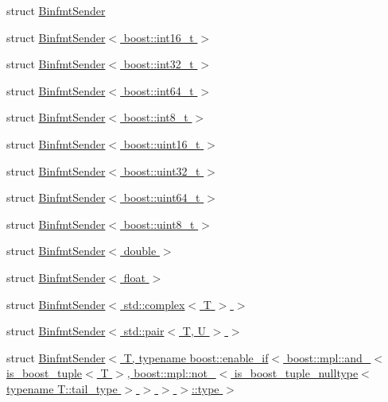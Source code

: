 \begin{DoxyCompactItemize}
\item 
struct \hyperlink{structgnuplotio_1_1_binfmt_sender}{Binfmt\+Sender}
\item 
struct \hyperlink{structgnuplotio_1_1_binfmt_sender_3_01boost_1_1int16__t_01_4}{Binfmt\+Sender$<$ boost\+::int16\+\_\+t $>$}
\item 
struct \hyperlink{structgnuplotio_1_1_binfmt_sender_3_01boost_1_1int32__t_01_4}{Binfmt\+Sender$<$ boost\+::int32\+\_\+t $>$}
\item 
struct \hyperlink{structgnuplotio_1_1_binfmt_sender_3_01boost_1_1int64__t_01_4}{Binfmt\+Sender$<$ boost\+::int64\+\_\+t $>$}
\item 
struct \hyperlink{structgnuplotio_1_1_binfmt_sender_3_01boost_1_1int8__t_01_4}{Binfmt\+Sender$<$ boost\+::int8\+\_\+t $>$}
\item 
struct \hyperlink{structgnuplotio_1_1_binfmt_sender_3_01boost_1_1uint16__t_01_4}{Binfmt\+Sender$<$ boost\+::uint16\+\_\+t $>$}
\item 
struct \hyperlink{structgnuplotio_1_1_binfmt_sender_3_01boost_1_1uint32__t_01_4}{Binfmt\+Sender$<$ boost\+::uint32\+\_\+t $>$}
\item 
struct \hyperlink{structgnuplotio_1_1_binfmt_sender_3_01boost_1_1uint64__t_01_4}{Binfmt\+Sender$<$ boost\+::uint64\+\_\+t $>$}
\item 
struct \hyperlink{structgnuplotio_1_1_binfmt_sender_3_01boost_1_1uint8__t_01_4}{Binfmt\+Sender$<$ boost\+::uint8\+\_\+t $>$}
\item 
struct \hyperlink{structgnuplotio_1_1_binfmt_sender_3_01double_01_4}{Binfmt\+Sender$<$ double $>$}
\item 
struct \hyperlink{structgnuplotio_1_1_binfmt_sender_3_01float_01_4}{Binfmt\+Sender$<$ float $>$}
\item 
struct \hyperlink{structgnuplotio_1_1_binfmt_sender_3_01std_1_1complex_3_01_t_01_4_01_4}{Binfmt\+Sender$<$ std\+::complex$<$ T $>$ $>$}
\item 
struct \hyperlink{structgnuplotio_1_1_binfmt_sender_3_01std_1_1pair_3_01_t_00_01_u_01_4_01_4}{Binfmt\+Sender$<$ std\+::pair$<$ T, U $>$ $>$}
\item 
struct \hyperlink{structgnuplotio_1_1_binfmt_sender_3_01_t_00_01typename_01boost_1_1enable__if_3_01boost_1_1mpl_1_e9270e5cb86823566a0af3940aa51061}{Binfmt\+Sender$<$ T, typename boost\+::enable\+\_\+if$<$ boost\+::mpl\+::and\+\_\+$<$ is\+\_\+boost\+\_\+tuple$<$ T $>$, boost\+::mpl\+::not\+\_\+$<$ is\+\_\+boost\+\_\+tuple\+\_\+nulltype$<$ typename T\+::tail\+\_\+type $>$ $>$ $>$ $>$\+::type $>$}

\end{DoxyCompactItemize}
